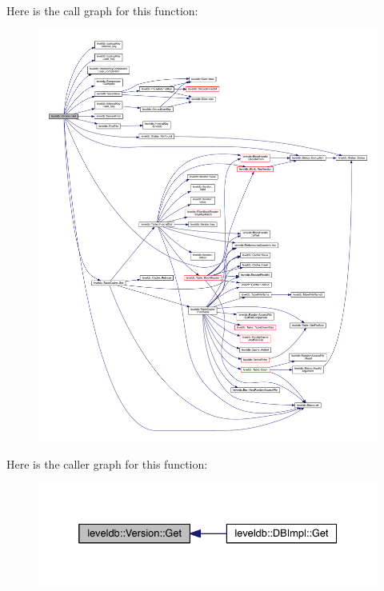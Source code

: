 Here is the call graph for this function\+:\nopagebreak
\begin{figure}[H]
\begin{center}
\leavevmode
\includegraphics[width=350pt]{classleveldb_1_1_version_ac6c1cfef845a4295debdb98ded55a247_cgraph}
\end{center}
\end{figure}




Here is the caller graph for this function\+:\nopagebreak
\begin{figure}[H]
\begin{center}
\leavevmode
\includegraphics[width=332pt]{classleveldb_1_1_version_ac6c1cfef845a4295debdb98ded55a247_icgraph}
\end{center}
\end{figure}


